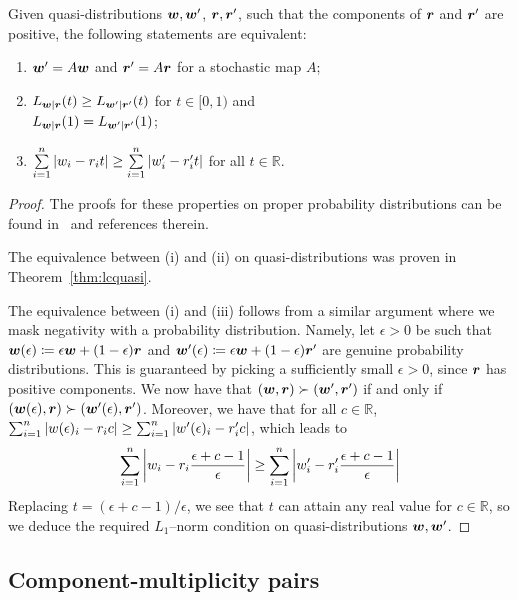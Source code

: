 \documentclass[pra,
aps,
twocolumn,
superscriptaddress,
groupedaddress,
nofootinbib,
reprint
]{revtex4-1}
\begin{document}
\begin{proposition}\label{prop:rmajor}
Given quasi-distributions $\boldsymbol{w}, \boldsymbol{w}'$, $\boldsymbol{r} , \boldsymbol{r}'$, such that the components of $\boldsymbol{r}$ and $\boldsymbol{r}'$ are positive, the following statements are equivalent:
  \begin{enumerate}
    \item[(i)] $\boldsymbol{w}' = A\boldsymbol{w}$ and $\boldsymbol{r}' = A\boldsymbol{r}$ for a stochastic map $A$;
    \item[(ii)] $L_{\boldsymbol{w}|\boldsymbol{r}}(t) \geq L_{\boldsymbol{w}'|\boldsymbol{r}'}(t)$ for $t\in [0,1)$ and \vspace{5pt}\\ $L_{\boldsymbol{w}|\boldsymbol{r}}(1) = L_{\boldsymbol{w}'|\boldsymbol{r}'}(1)$;
    \item[(iii)] $\sum\limits_{i=1}^n \abs{w_i - r_i t} \geq \sum\limits_{i=1}^n \abs{w'_i - r'_i t}$ for all $t \in \mathbb{R}$.
  \end{enumerate}
\end{proposition}
\begin{proof}
	The proofs for these properties on proper probability distributions can be found in~\cite{cit:marshall,ruch_mixing_1978,Renes_2016,Buscemi_2017} and references therein.
	
	The equivalence between (i) and (ii) on quasi-distributions was proven in Theorem~\ref{thm:lcquasi}.
	
	The equivalence between (i) and (iii) follows from a similar argument where we mask negativity with a probability distribution.
	Namely, let $\epsilon > 0$ be such that $\boldsymbol{w}(\epsilon) \coloneqq \epsilon \boldsymbol{w} + (1-\epsilon) \boldsymbol{r}$ and $\boldsymbol{w}'(\epsilon) \coloneqq \epsilon \boldsymbol{w} + (1-\epsilon) \boldsymbol{r}'$ are genuine probability distributions. This is guaranteed by picking a sufficiently small $\epsilon > 0$, since $\boldsymbol{r}$ has positive components. We now have that $(\boldsymbol{w} , \boldsymbol{r}) \succ (\boldsymbol{w}', \boldsymbol{r}')$ if and only if $(\boldsymbol{w}(\epsilon) , \boldsymbol{r}) \succ (\boldsymbol{w}'(\epsilon), \boldsymbol{r}')$.
	Moreover, we have that for all $c \in \mathbb{R}$, $\sum_{i=1}^n \abs{w(\epsilon)_i - r_i c} \geq \sum_{i=1}^n \abs{w'(\epsilon)_i - r'_i c}$, which leads to
	\begin{align*}
		\sum\limits_{i=1}^n \abs{w_i - r_i \frac{\epsilon + c - 1}{\epsilon}} \geq \sum\limits_{i=1}^n \abs{w'_i - r'_i \frac{\epsilon + c - 1}{\epsilon}}
	\end{align*}
Replacing $t = (\epsilon + c - 1)/\epsilon$, we see that $t$ can attain any real value for $c \in \mathbb{R}$, so we deduce the required $L_1$--norm condition on quasi-distributions $\boldsymbol{w}, \boldsymbol{w}'$.
\end{proof}

\subsection{Component-multiplicity pairs}
\label{app:cmpairs}
\end{document}
